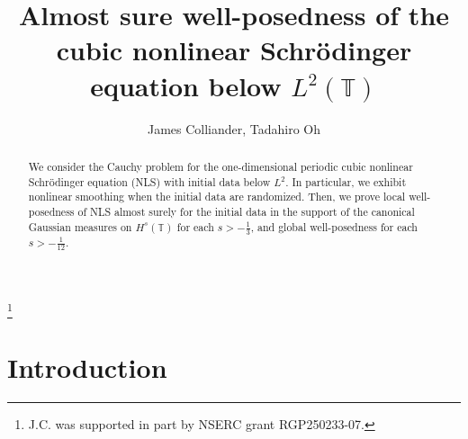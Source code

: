 \documentclass[11pt]{amsart}
\numberwithin{equation}{section} \numberwithin{theorem}{section}
\begin{document}
\title [Almost Sure Well-Posedness of NLS below $L^2$] {\bf Almost sure well-posedness of the cubic nonlinear Schr\"odinger equation below $L^2 (\mathbb{T})$}

\author{James Colliander, Tadahiro Oh}

\address{James Colliander\\
Department of Mathematics\\
University of Toronto\\
40 St. George St, Toronto, ON M5S 2E4, Canada}
\thanks{J.C. was supported in part by NSERC grant RGP250233-07.}

\address{Tadahiro Oh\\
Department of Mathematics\\
University of Toronto\\
40 St. George St, Toronto, ON M5S 2E4, Canada}




\begin{abstract}
We consider the Cauchy problem for the one-dimensional periodic cubic nonlinear Schr\"odinger 
equation (NLS) with initial data below $L^2$. 
In particular, we exhibit nonlinear smoothing when the initial data are randomized. 
Then, we prove local well-posedness of NLS almost surely for the initial data 
in the support of the canonical Gaussian measures on $H^s(\mathbb{T})$ for each $s > -\frac{1}{3}$,
and global well-posedness for each $s > -\frac{1}{12}$.

\end{abstract}

\maketitle

\tableofcontents

\newpage

\section{Introduction}
\end{document}
